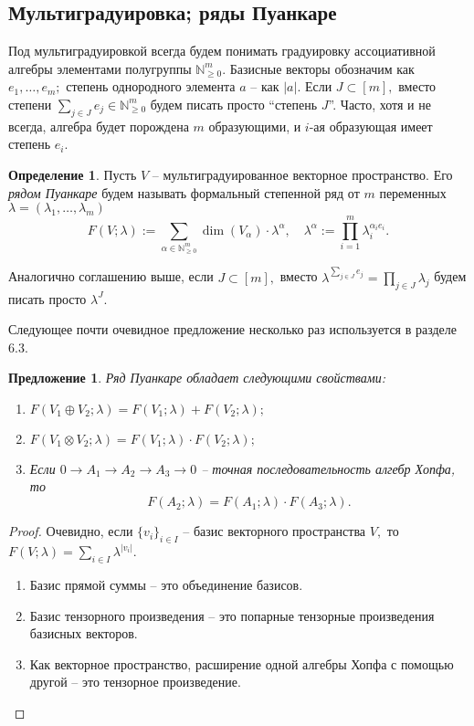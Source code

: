 \documentclass[10pt,a4paper]{article}
\def\NN{\mathbb{N}}
\def\Nm{\NN_{\geq 0}^m}
\newtheorem{prp}[thm]{Предложение}
\theoremstyle{definition}
\newtheorem{dfn}[thm]{Определение}
\begin{document}
\subsection{Мультиградуировка; ряды Пуанкаре}
Под мультиградуировкой всегда будем понимать градуировку ассоциативной алгебры элементами полугруппы $\mathbb{N}_{\geq 0}^m.$ Базисные векторы обозначим как $e_1,\dots,e_m;$ степень однородного элемента $a$ -- как $|a|.$ Если $J\subset[m],$ вместо степени $\sum_{j\in J}e_j\in\Nm$ будем писать просто ``степень $J$''. Часто, хотя и не всегда, алгебра будет порождена $m$ образующими, и $i$-ая образующая имеет степень $e_i.$
\begin{dfn}
Пусть $V$ -- мультиградуированное векторное пространство. Его \emph{рядом Пуанкаре} будем называть формальный степенной ряд от $m$ переменных $\lambda=(\lambda_1,\dots,\lambda_m)$
$$F(V;\lambda):=\sum_{\alpha\in \mathbb{N}_{\geq 0}^m} \dim(V_\alpha)\cdot \lambda^\alpha,\quad\lambda^\alpha:=\prod_{i=1}^m \lambda_i^{\alpha_ie_i}.$$
\end{dfn}
Аналогично соглашению выше, если $J\subset[m],$ вместо $\lambda^{\sum_{j\in J}e_j}=\prod_{j\in J}\lambda_j$ будем писать просто $\lambda^J.$

Следующее почти очевидное предложение несколько раз используется в разделе 6.3.
\begin{prp}
Ряд Пуанкаре обладает следующими свойствами:
\begin{enumerate}
\item $F(V_1\oplus V_2;\lambda)=F(V_1;\lambda)+F(V_2;\lambda);$
\item $F(V_1\otimes V_2;\lambda)=F(V_1;\lambda)\cdot F(V_2;\lambda);$
\item Если $0\to A_1\to A_2\to A_3\to 0$ -- точная последовательность алгебр Хопфа, то $$F(A_2;\lambda)=F(A_1;\lambda)\cdot F(A_3;\lambda).$$
\end{enumerate}
\end{prp}
\begin{proof}
Очевидно, если $\{v_i\}_{i\in I}$ -- базис векторного пространства $V,$ то $F(V;\lambda)=\sum_{i\in I}\lambda^{|v_i|}.$
\begin{enumerate}
\item Базис прямой суммы -- это объединение базисов.
\item Базис тензорного произведения -- это попарные тензорные произведения базисных векторов.
\item Как векторное пространство, расширение одной алгебры Хопфа с помощью другой -- это тензорное произведение.
\end{enumerate}
\end{proof}
\end{document}
